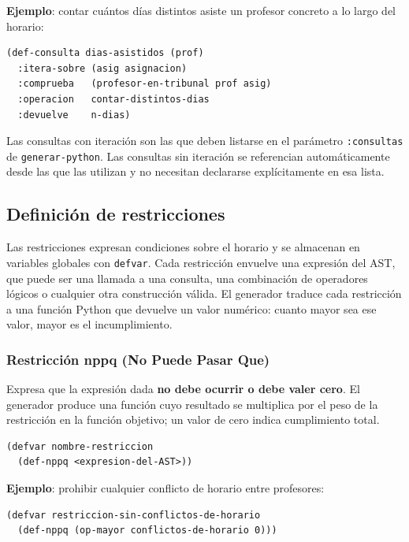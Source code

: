 \documentclass[12pt,a4paper]{article}
\newcommand{\code}[1]{\texttt{#1}}
\begin{document}
\textbf{Ejemplo}: contar cuántos días distintos asiste un profesor
concreto a lo largo del horario:

\begin{lstlisting}[style=lisp, caption={Consulta: días distintos de asistencia}]
(def-consulta dias-asistidos (prof)
  :itera-sobre (asig asignacion)
  :comprueba   (profesor-en-tribunal prof asig)
  :operacion   contar-distintos-dias
  :devuelve    n-dias)
\end{lstlisting}

Las consultas con iteración son las que deben listarse en el parámetro
\code{:consultas} de \code{generar-python}. Las consultas sin iteración
se referencian automáticamente desde las que las utilizan y no necesitan
declararse explícitamente en esa lista.

\subsection{Definición de restricciones}
\label{sec:restricciones}

Las restricciones expresan condiciones sobre el horario y se almacenan
en variables globales con \code{defvar}. Cada restricción envuelve una
expresión del AST, que puede ser una llamada a una consulta, una
combinación de operadores lógicos o cualquier otra construcción válida.
El generador traduce cada restricción a una función Python que devuelve
un valor numérico: cuanto mayor sea ese valor, mayor es el
incumplimiento.

\subsubsection{Restricción nppq (No Puede Pasar Que)}

Expresa que la expresión dada \textbf{no debe ocurrir o debe valer
cero}. El generador produce una función cuyo resultado se multiplica
por el peso de la restricción en la función objetivo; un valor de cero
indica cumplimiento total.

\begin{lstlisting}[style=lisp, caption={Sintaxis de restricción nppq}]
(defvar nombre-restriccion
  (def-nppq <expresion-del-AST>))
\end{lstlisting}

\textbf{Ejemplo}: prohibir cualquier conflicto de horario entre
profesores:

\begin{lstlisting}[style=lisp, caption={Restricción nppq: sin conflictos de horario}]
(defvar restriccion-sin-conflictos-de-horario
  (def-nppq (op-mayor conflictos-de-horario 0)))
\end{lstlisting}
\end{document}
